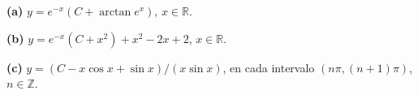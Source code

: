 \noindent\textbf{(a)} $y=e^{-x}(C+\arctan e^x)$, $x\in\mathbb R$.

\noindent\textbf{(b)} $y=e^{-x}(C+x^2)+x^2-2x+2$, $x\in\mathbb R$.

\noindent\textbf{(c)} $y=(C-x\cos x+\sin x)/(x\sin x)$, en cada intervalo $(n\pi,(n+1)\pi)$, $n\in\mathbb Z$.
